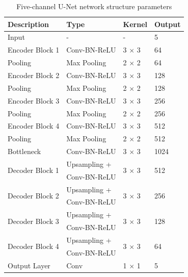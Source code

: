 \documentclass[12pt]{iopart}
\begin{document}
\begin{table}[htbp]
    \centering
    \caption{Five-channel U-Net network structure parameters}
    \label{tab:unet_architecture}
    \begin{tabular}{@{}p{4cm}p{4cm}p{3cm}p{3cm}@{}}
    \toprule
    \textbf{Description} & \textbf{Type} & \textbf{Kernel} & \textbf{Output} \\ \midrule
    Input & - & - & 5 \\
    Encoder Block 1 & Conv-BN-ReLU & 3 $\times$ 3 & 64 \\
    Pooling & Max Pooling & 2 $\times$ 2 & 64 \\
    Encoder Block 2 & Conv-BN-ReLU & 3 $\times$ 3 & 128 \\
    Pooling & Max Pooling & 2 $\times$ 2 & 128 \\
    Encoder Block 3 & Conv-BN-ReLU & 3 $\times$ 3 & 256 \\
    Pooling & Max Pooling & 2 $\times$ 2 & 256 \\
    Encoder Block 4 & Conv-BN-ReLU & 3 $\times$ 3 & 512 \\
    Pooling & Max Pooling & 2 $\times$ 2 & 512 \\
    Bottleneck & Conv-BN-ReLU & 3 $\times$ 3 & 1024 \\
    \multirow{2}{*}{Decoder Block 1} & Upsampling + & \multirow{2}{*}{3 $\times$ 3} & \multirow{2}{*}{512} \\
    & Conv-BN-ReLU & & \\
    \multirow{2}{*}{Decoder Block 2} & Upsampling + & \multirow{2}{*}{3 $\times$ 3} & \multirow{2}{*}{256} \\
    & Conv-BN-ReLU & & \\
    \multirow{2}{*}{Decoder Block 3} & Upsampling + & \multirow{2}{*}{3 $\times$ 3} & \multirow{2}{*}{128} \\
    & Conv-BN-ReLU & & \\
    \multirow{2}{*}{Decoder Block 4} & Upsampling + & \multirow{2}{*}{3 $\times$ 3} & \multirow{2}{*}{64} \\
    & Conv-BN-ReLU & & \\
    Output Layer & Conv & 1 $\times$ 1 & 5 \\ \bottomrule
    \end{tabular}
\end{table}
\end{document}
